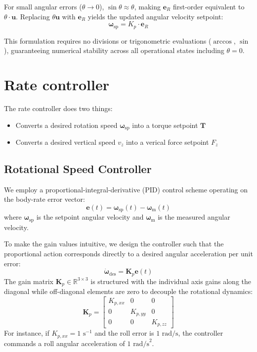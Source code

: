 \documentclass{article}
\begin{document}
	For small angular errors ($\theta \to 0$), $\sin\theta \approx \theta$, making $\mathbf{e}_R$ first-order equivalent to $\theta \cdot \mathbf{u}$. Replacing $\theta \mathbf{u}$ with $\mathbf{e}_R$ yields the updated angular velocity setpoint:
	\begin{equation*}
		\bm{\omega}_{\text{sp}} = K_p \cdot \mathbf{e}_R
	\end{equation*}
	
	This formulation requires no divisions or trigonometric evaluations ($\arccos$, $\sin$), guaranteeing numerical stability across all operational states including $\theta = 0$.
	
	\section{Rate controller}
	
	The rate controller does two things:
	\begin{itemize}
		\item Converts a desired rotation speed $\bm{\omega}_{\mathrm{sp}}$ into a torque setpoint $\mathbf{T}$
		\item Converts a desired vertical speed $v_z$ into a verical force setpoint $F_z$
	\end{itemize}
	
	
	\subsection{Rotational Speed Controller}
	
	We employ a proportional-integral-derivative (PID) control scheme operating on the body-rate error vector:
	\begin{equation}
		\mathbf{e}(t) = \bm{\omega}_{\mathrm{sp}}(t) - \bm{\omega}_{\mathrm{m}}(t)
	\end{equation}
	where $\bm{\omega}_{\mathrm{sp}}$ is the setpoint angular velocity and $\bm{\omega}_{\mathrm{m}}$ is the measured angular velocity.
	
	To make the gain values intuitive, we design the controller such that the proportional action corresponds directly to a desired angular acceleration per unit error:
	\begin{equation}
		\dot{\bm{\omega}}_{\mathrm{des}} = \mathbf{K}_p \mathbf{e}(t)
	\end{equation}
	The gain matrix $\mathbf{K}_p \in \mathbb{R}^{3 \times 3}$ is structured with the individual axis gains along the diagonal while off-diagonal elements are zero to decouple the rotational dynamics:
	\begin{equation}
		\mathbf{K}_p = 
		\begin{bmatrix}
			K_{p,xx} & 0 & 0 \\
			0 & K_{p,yy} & 0 \\
			0 & 0 & K_{p,zz}
		\end{bmatrix}
	\end{equation}
	For instance, if $K_{p,xx} = 1\text{ s}^{-1}$ and the roll error is $1\text{ rad/s}$, the controller commands a roll angular acceleration of $1\text{ rad/s}^2$.
	
\end{document}
